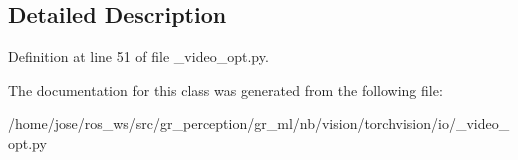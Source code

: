 \subsection{Detailed Description}


Definition at line 51 of file \+\_\+video\+\_\+opt.\+py.



The documentation for this class was generated from the following file\+:\begin{DoxyCompactItemize}
\item 
/home/jose/ros\+\_\+ws/src/gr\+\_\+perception/gr\+\_\+ml/nb/vision/torchvision/io/\+\_\+video\+\_\+opt.\+py\end{DoxyCompactItemize}
